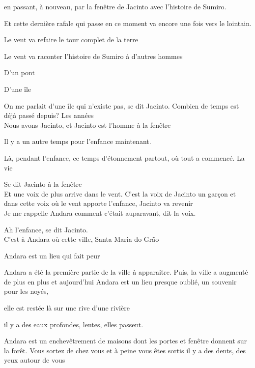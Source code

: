 en passant, à nouveau, par la fenêtre de Jacinto avec l'histoire de
Sumiro.

Et cette dernière rafale qui passe en ce moment va encore une fois vers
le lointain.

Le vent va refaire le tour complet de la terre

Le vent va raconter l'histoire de Sumiro à d'autres hommes

\clearpage
\thispagestyle{empty}
\movetoevenpage

\vspace*{4cm}

D'un pont

D'une île

On me parlait d'une île qui n'existe pas, se dit Jacinto. Combien de
temps est déjà passé depuis? Les années\\

Nous avons Jacinto, et Jacinto est l'homme à la fenêtre

\pagebreak

\vspace*{4cm}

Il y a un autre temps pour l'enfance maintenant.

Là, pendant l'enfance, ce temps d'étonnement partout, où tout a
commencé. La vie

Se dit Jacinto à la fenêtre\\

Et une voix de plus arrive dans le vent. C'est la voix de Jacinto un
garçon et dans cette voix où le vent apporte l'enfance, Jacinto va
revenir\\

Je me rappelle Andara comment c'était auparavant, dit la voix.

Ah l'enfance, se dit Jacinto.\\

C'est à Andara où cette ville, Santa Maria do Grão

Andara est un lieu qui fait peur

Andara a été la première partie de la ville à apparaitre. Puis, la ville
a augmenté de plus en plus et aujourd'hui Andara est un lieu presque
oublié, un souvenir pour les noyés,

elle est restée là sur une rive d'une rivière

il y a des eaux profondes, lentes, elles passent.

Andara est un enchevêtrement de maisons dont les portes et fenêtre
donnent sur la forêt. Vous sortez de chez vous et à peine vous êtes
sortis il y a des dents, des yeux autour de vous

